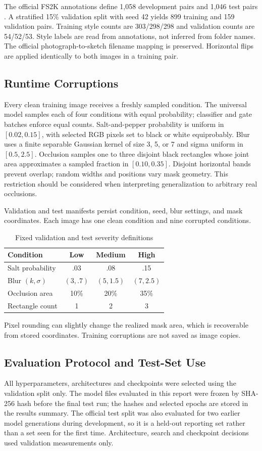 \documentclass[conference]{IEEEtran}
\begin{document}
The official FS2K annotations define 1,058 development pairs and 1,046 test
pairs \cite{fs2k}. A stratified 15\% validation split with seed 42 yields 899
training and 159 validation pairs. Training style counts are 303/298/298 and
validation counts are 54/52/53. Style labels are read from annotations, not
inferred from folder names. The official photograph-to-sketch filename mapping
is preserved. Horizontal flips are applied identically to both images in a
training pair.

\subsection{Runtime Corruptions}
Every clean training image receives a freshly sampled condition. The universal
model samples each of four conditions with equal probability; classifier and
gate batches enforce equal counts. Salt-and-pepper probability is uniform in
$[0.02,0.15]$, with selected RGB pixels set to black or white equiprobably. Blur
uses a finite separable Gaussian kernel of size 3, 5, or 7 and sigma uniform in
$[0.5,2.5]$. Occlusion samples one to three disjoint black rectangles whose
joint area approximates a sampled fraction in $[0.10,0.35]$. Disjoint horizontal
bands prevent overlap; random widths and positions vary mask geometry. This
restriction should be considered when interpreting generalization to arbitrary
real occlusions.

Validation and test manifests persist condition, seed, blur settings, and mask
coordinates. Each image has one clean condition and nine corrupted conditions.
\begin{table}[!ht]\centering\caption{Fixed validation and test severity definitions}
\begin{tabular}{lccc}\toprule Condition & Low & Medium & High\\\midrule
Salt probability & .03 & .08 & .15\\
Blur $(k,\sigma)$ & $(3,.7)$ & $(5,1.5)$ & $(7,2.5)$\\
Occlusion area & 10\% & 20\% & 35\%\\
Rectangle count & 1 & 2 & 3\\\bottomrule\end{tabular}\end{table}
Pixel rounding can slightly change the realized mask area, which is recoverable
from stored coordinates. Training corruptions are not saved as image copies.

\subsection{Evaluation Protocol and Test-Set Use}\label{sec:protocol}
All hyperparameters, architectures and checkpoints were selected using the
validation split only. The model files evaluated in this report were frozen by
SHA-256 hash before the final test run; the hashes and selected epochs are
stored in the results summary. The official test split was also evaluated for
two earlier model generations during development, so it is a held-out reporting
set rather than a set seen for the first time. Architecture, search and checkpoint
decisions used validation measurements only.
\end{document}
